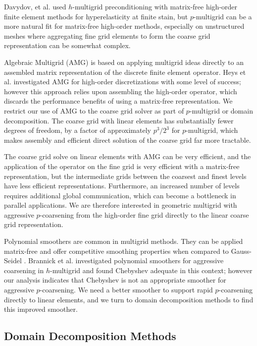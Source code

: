 Davydov, et al. \cite{davydov2019matrix} used $h$-multigrid preconditioning with matrix-free high-order finite element methods for hyperelasticity at finite stain, but $p$-multigrid can be a more natural fit for matrix-free high-order methods, especially on unstructured meshes where aggregating fine grid elements to form the coarse grid representation can be somewhat complex.

Algebraic Multigrid (AMG) is based on applying multigrid ideas directly to an assembled matrix representation of the discrete finite element operator.
Heys et al. \cite{heys2005algebraic} investigated AMG for high-order discretizations with some level of success; however this approach relies upon assembling the high-order operator, which discards the performance benefits of using a matrix-free representation.
We restrict our use of AMG to the coarse grid solver as part of $p$-multigrid or domain decomposition.
The coarse grid with linear elements has substantially fewer degrees of freedom, by a factor of approximately $p^3 / 2^3$ for $p$-multigrid, which makes assembly and efficient direct solution of the coarse grid far more tractable.

The coarse grid solve on linear elements with AMG can be very efficient, and the application of the operator on the fine grid is very efficient with a matrix-free representation, but the intermediate grids between the coarsest and finest levels have less efficient representations.
Furthermore, an increased number of levels requires additional global communication, which can become a bottleneck in parallel applications.
We are therefore interested in geometric multigrid with aggressive $p$-coarsening from the high-order fine grid directly to the linear coarse grid representation.

Polynomial smoothers are common in multigrid methods.
They can be applied matrix-free and offer competitive smoothing properties when compared to Gauss-Seidel \cite{adams2003parallel}.
Brannick et al. \cite{brannick2015polynomial} investigated polynomial smoothers for aggressive coarsening in $h$-multigrid and found Chebyshev adequate in this context; however our analysis indicates that Chebyshev is not an appropriate smoother for aggressive $p$-coarsening.
We need a better smoother to support rapid $p$-coarsening directly to linear elements, and we turn to domain decomposition methods to find this improved smoother.

\subsection{Domain Decomposition Methods}

